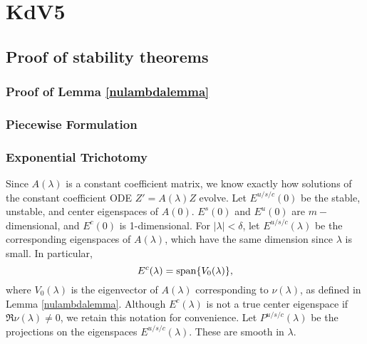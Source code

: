 \documentclass[thesis.tex]{subfiles}
\begin{document}
\iffulldocument\else
	\chapter{KdV5}
\fi

\section{Proof of stability theorems} 

\subsection{Proof of Lemma \ref{nulambdalemma}}


\subsection{Piecewise Formulation}







\subsection{Exponential Trichotomy}

Since $A(\lambda)$ is a constant coefficient matrix, we know exactly how solutions of the constant coefficient ODE $Z' = A(\lambda)Z$ evolve. Let $E^{u/s/c}(0)$ be the stable, unstable, and center eigenspaces of $A(0)$. $E^s(0)$ and $E^u(0)$ are $m-$dimensional, and $E^c(0)$ is 1-dimensional. For $|\lambda| < \delta$, let $E^{u/s/c}(\lambda)$ be the corresponding eigenspaces of $A(\lambda)$, which have the same dimension since $\lambda$ is small. In particular, 
\[
E^c(\lambda) = \operatorname{span}\{ V_0(\lambda) \},
\]
where $V_0(\lambda)$ is the eigenvector of $A(\lambda)$ corresponding to $\nu(\lambda)$, as defined in Lemma \ref{nulambdalemma}. Although $E^c(\lambda)$ is not a true center eigenspace if $\Re \nu(\lambda) \neq 0$, we retain this notation for convenience. Let $P^{u/s/c}(\lambda)$ be the projections on the eigenspaces $E^{u/s/c}(\lambda)$. These are smooth in $\lambda$. 
\end{document}
